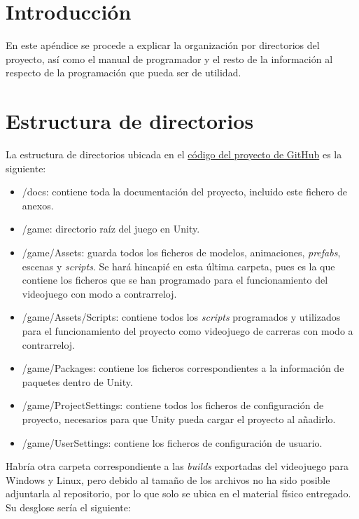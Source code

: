 
\section{Introducción}

En este apéndice se procede a explicar la organización por directorios del proyecto, así como el manual de programador y el resto de la información al respecto de la programación que pueda ser de utilidad.

\section{Estructura de directorios}

La estructura de directorios ubicada en el \href{https://github.com/Kencho/fastastic-roads}{código del proyecto de GitHub} es la siguiente:

\begin{itemize}
\tightlist
	\item /docs: contiene toda la documentación del proyecto, incluido este fichero de anexos. 
	\item /game: directorio raíz del juego en Unity.
	\item /game/Assets: guarda todos los ficheros de modelos, animaciones, \textit{prefabs}, escenas y \textit{scripts}. Se hará hincapié en esta última carpeta, pues es la que contiene los ficheros que se han programado para el funcionamiento del videojuego con modo a contrarreloj.
	\item /game/Assets/Scripts: contiene todos los \textit{scripts} programados y utilizados para el funcionamiento del proyecto como videojuego de carreras con modo a contrarreloj.
	\item /game/Packages: contiene los ficheros correspondientes a la información de paquetes dentro de Unity.
	\item /game/ProjectSettings: contiene todos los ficheros de configuración de proyecto, necesarios para que Unity pueda cargar el proyecto al añadirlo.
	\item /game/UserSettings: contiene los ficheros de configuración de usuario.
\end{itemize}

Habría otra carpeta correspondiente a las \textit{builds} exportadas del videojuego para Windows y Linux, pero debido al tamaño de los archivos no ha sido posible adjuntarla al repositorio, por lo que solo se ubica en el material físico entregado. Su desglose sería el siguiente:

